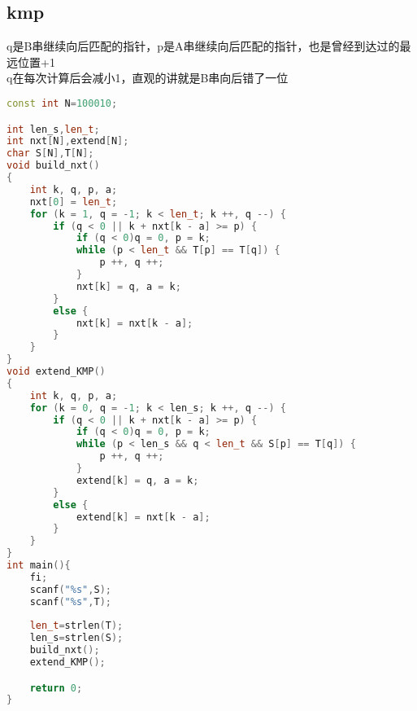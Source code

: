 \subsection{kmp}
	q是B串继续向后匹配的指针，p是A串继续向后匹配的指针，也是曾经到达过的最远位置+1\\
	q在每次计算后会减小1，直观的讲就是B串向后错了一位
	
		\begin{lstlisting}[language=c++]
const int N=100010;

int len_s,len_t;
int nxt[N],extend[N];
char S[N],T[N];
void build_nxt()
{
	int k, q, p, a;
	nxt[0] = len_t;
	for (k = 1, q = -1; k < len_t; k ++, q --) {
		if (q < 0 || k + nxt[k - a] >= p) {
			if (q < 0)q = 0, p = k;
			while (p < len_t && T[p] == T[q]) {
				p ++, q ++;
			}
			nxt[k] = q, a = k;
		}
		else {
			nxt[k] = nxt[k - a];
		}
	}
}
void extend_KMP()
{
	int k, q, p, a;
	for (k = 0, q = -1; k < len_s; k ++, q --) {
		if (q < 0 || k + nxt[k - a] >= p) {
			if (q < 0)q = 0, p = k;
			while (p < len_s && q < len_t && S[p] == T[q]) {
				p ++, q ++;
			}
			extend[k] = q, a = k;
		}
		else {
			extend[k] = nxt[k - a];
		}
	}
}
int main(){
	fi;
	scanf("%s",S);
	scanf("%s",T);
	
	len_t=strlen(T);
	len_s=strlen(S);
	build_nxt();
	extend_KMP();

	return 0;
}
		\end{lstlisting}